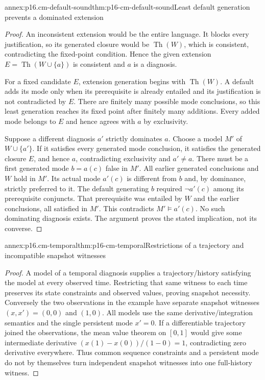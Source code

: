 \begin{annexitem}{annex:p16.cm-default-sound}{thm:p16-cm-default-sound}{Least default generation prevents a dominated extension}
\begin{proof}
An inconsistent extension would be the entire language. It blocks every
justification, so its generated closure would be \(\operatorname{Th}(W)\),
which is consistent, contradicting the fixed-point condition. Hence the
given extension \(E=\operatorname{Th}(W\cup\{a\})\) is consistent and
\(a\) is a diagnosis.

For a fixed candidate \(E\), extension generation begins with
\(\operatorname{Th}(W)\). A default adds its mode only when its
prerequisite is already entailed and its justification is not contradicted
by \(E\). There are finitely many possible mode conclusions, so this least
generation reaches its fixed point after finitely many additions. Every
added mode belongs to \(E\) and hence agrees with \(a\) by exclusivity.

Suppose a different diagnosis \(a'\) strictly dominates \(a\).
Choose a model \(M'\) of \(W\cup\{a'\}\). If it satisfies every
generated mode conclusion, it satisfies the generated closure \(E\),
and hence \(a\), contradicting exclusivity and \(a'\ne a\).
There must be a first generated mode \(b=a(c)\) false in \(M'\).
All earlier generated conclusions and \(W\) hold in \(M'\).
Its actual mode \(a'(c)\) is different from \(b\) and, by dominance,
strictly preferred to it. The default generating \(b\) required
\(\neg a'(c)\) among its prerequisite conjuncts. That prerequisite was
entailed by \(W\) and the earlier conclusions, all satisfied in \(M'\).
This contradicts \(M'\models a'(c)\). No such dominating diagnosis
exists. The argument proves the stated implication, not its converse.
\end{proof}
\end{annexitem}

\begin{annexitem}{annex:p16.cm-temporal}{thm:p16-cm-temporal}{Restrictions of a trajectory and incompatible snapshot witnesses}
\begin{proof}
A model of a temporal diagnosis supplies a trajectory/history satisfying
the model at every observed time. Restricting that same witness to each
time preserves its state constraints and observed values, proving snapshot
necessity. Conversely the two observations in the example have separate
snapshot witnesses \((x,x')=(0,0)\) and \((1,0)\). All models use the
same derivative/integration semantics and the single persistent mode
\(x'=0\). If a differentiable trajectory joined the observations, the
mean value theorem on \([0,1]\) would give some intermediate derivative
\((x(1)-x(0))/(1-0)=1\), contradicting zero derivative everywhere.
Thus common sequence constraints and a persistent mode do not by themselves
turn independent snapshot witnesses into one full-history witness.
\end{proof}
\end{annexitem}


